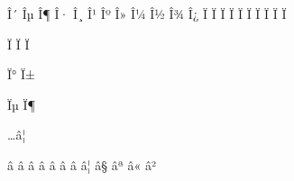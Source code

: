 \mubyte \delta ^^ce^^b4\endmubyte %
\mubyte \varepsilon ^^ce^^b5\endmubyte %
\mubyte \zeta ^^ce^^b6\endmubyte %
\mubyte \eta ^^ce^^b7\endmubyte %
\mubyte \theta ^^ce^^b8\endmubyte %
\mubyte \iota ^^ce^^b9\endmubyte %
\mubyte \kappa ^^ce^^ba\endmubyte %
\mubyte \lambda ^^ce^^bb\endmubyte %
\mubyte \mu ^^ce^^bc\endmubyte %
\mubyte \nu ^^ce^^bd\endmubyte %
\mubyte \xi ^^ce^^be\endmubyte %
\mubyte \omicron ^^ce^^bf\endmubyte %
\mubyte \pi ^^cf^^80\endmubyte %
\mubyte \rho ^^cf^^81\endmubyte %
\mubyte \varsigma ^^cf^^82\endmubyte %
\mubyte \sigma ^^cf^^83\endmubyte %
\mubyte \tau ^^cf^^84\endmubyte %
\mubyte \upsilon ^^cf^^85\endmubyte %
\mubyte \varphi ^^cf^^86\endmubyte %
\mubyte \chi ^^cf^^87\endmubyte %
\mubyte \psi ^^cf^^88\endmubyte %
\mubyte \omega ^^cf^^89\endmubyte %

\mubyte \vartheta ^^cf^^91\endmubyte %
\mubyte \phi ^^cf^^95\endmubyte %
\mubyte \varpi ^^cf^^96\endmubyte %

\mubyte \varkappa ^^cf^^b0\endmubyte %
\mubyte \varrho ^^cf^^b1\endmubyte %

\mubyte \epsilon ^^cf^^b5\endmubyte %
\mubyte \backepsilon ^^cf^^b6\endmubyte %

\mubyte \ldots ^^e2^^80^^a6\endmubyte %

\mubyte \degreeC ^^e2^^84^^83\endmubyte %
\mubyte \degreeF ^^e2^^84^^89\endmubyte %
\mubyte \hbar ^^e2^^84^^8f\endmubyte %
\mubyte \Im ^^e2^^84^^91\endmubyte %
\mubyte \ell ^^e2^^84^^93\endmubyte %
\mubyte \wp ^^e2^^84^^98\endmubyte %
\mubyte \Re ^^e2^^84^^9c\endmubyte %
\mubyte \Omega ^^e2^^84^^a6\endmubyte %
\mubyte \mho ^^e2^^84^^a7\endmubyte %
\mubyte \Kelvin ^^e2^^84^^aa\endmubyte %
\mubyte \Angstrom ^^e2^^84^^ab\endmubyte %
\mubyte \Finv ^^e2^^84^^b2\endmubyte %

